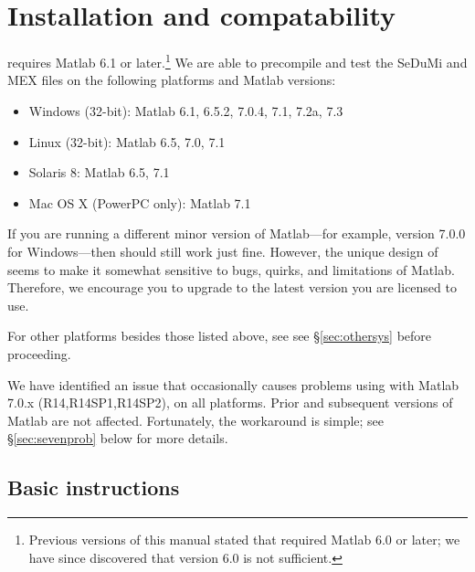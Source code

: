 \documentclass[12pt]{article}
\begin{document}
\newpage
\appendix

\section{Installation and compatability}
\label{s-installing}

\cvx requires Matlab 6.1 or later.\footnote{Previous
versions of this manual stated that \cvx required Matlab
6.0 or later; we have since discovered that version 6.0
is not sufficient.}
We are able to precompile and test the SeDuMi
and \cvx MEX files on the following platforms and Matlab versions:
\begin{itemize}
\item Windows (32-bit): Matlab 6.1, 6.5.2, 7.0.4, 7.1, 7.2a, 7.3
\item Linux (32-bit): Matlab 6.5, 7.0, 7.1
\item Solaris 8: Matlab 6.5, 7.1
\item Mac OS X (PowerPC only): Matlab 7.1
\end{itemize}
If you are running a different minor version of Matlab---for example, version
7.0.0 for Windows---then \cvx should still work just fine. However, the unique
design of \cvx seems to make it somewhat sensitive to bugs, quirks, and 
limitations of Matlab. Therefore, we encourage you to upgrade to the latest
version you are licensed to use.

For other platforms besides those listed above, see
see \S\ref{sec:othersys} before proceeding.

We have identified an issue that occasionally causes problems using \cvx
with Matlab 7.0.x (R14,R14SP1,R14SP2), on all platforms. Prior and subsequent
versions of Matlab are not affected. Fortunately, the workaround is
simple; see \S\ref{sec:sevenprob} below for more details.

\subsection{Basic instructions}
\label{sec:winlin}
\end{document}
